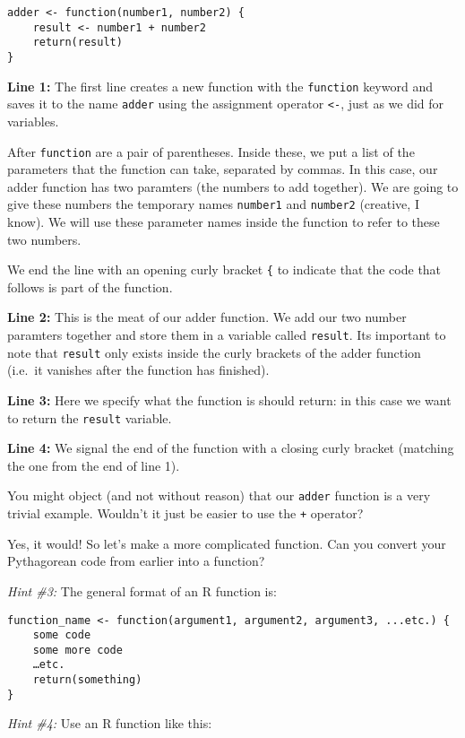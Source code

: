 \documentclass[
]{book}
\begin{document}
\begin{verbatim}
adder <- function(number1, number2) {
    result <- number1 + number2
    return(result)
}
\end{verbatim}

\textbf{Line 1:} The first line creates a new function with the \texttt{function} keyword and saves it to the name \texttt{adder} using the assignment operator \texttt{\textless{}-}, just as we did for variables.

After \texttt{function} are a pair of parentheses. Inside these, we put a list of the parameters that the function can take, separated by commas. In this case, our adder function has two paramters (the numbers to add together). We are going to give these numbers the temporary names \texttt{number1} and \texttt{number2} (creative, I know). We will use these parameter names inside the function to refer to these two numbers.

We end the line with an opening curly bracket \texttt{\{} to indicate that the code that follows is part of the function.

\textbf{Line 2:} This is the meat of our adder function. We add our two number paramters together and store them in a variable called \texttt{result}. Its important to note that \texttt{result} only exists inside the curly brackets of the adder function (i.e.~it vanishes after the function has finished).

\textbf{Line 3:} Here we specify what the function is should return: in this case we want to return the \texttt{result} variable.

\textbf{Line 4:} We signal the end of the function with a closing curly bracket (matching the one from the end of line 1).

You might object (and not without reason) that our \texttt{adder} function is a very trivial example. Wouldn't it just be easier to use the \texttt{+} operator?

Yes, it would! So let's make a more complicated function. Can you convert your Pythagorean code from earlier into a function?

\emph{Hint \#3:} The general format of an R function is:

\begin{verbatim}
function_name <- function(argument1, argument2, argument3, ...etc.) {
    some code
    some more code
    …etc.
    return(something)
}
\end{verbatim}

\emph{Hint \#4:} Use an R function like this:
\end{document}

